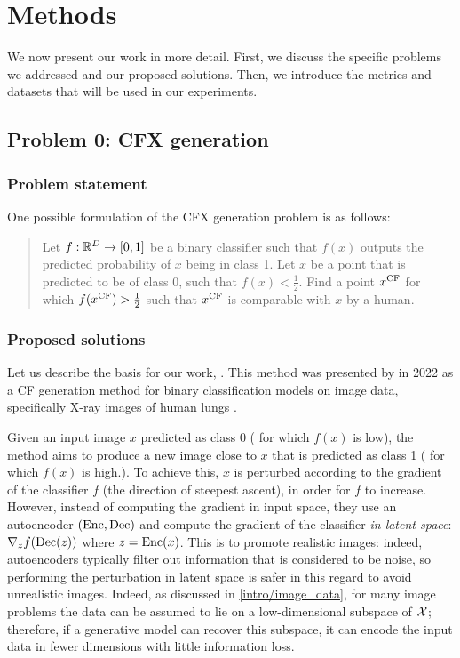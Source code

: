 \documentclass[../main.tex]{subfiles}
\begin{document}
\chapter{Methods}
\label{ch:methods}

We now present our work in more detail.
First, we discuss the specific problems we addressed and our proposed solutions.
Then, we introduce the metrics and datasets that will be used in our experiments.

\section{Problem 0: CFX generation}

\subsection{Problem statement}

One possible formulation of the CFX generation problem is as follows:
\begin{quote}
Let $f: \mathbb{R}^D \to [0, 1]$ be a binary classifier such that $f(x)$ outputs the predicted probability of $x$ being in class 1.
Let $x$ be a point that is predicted to be of class 0, \ie{} such that $f(x) < \frac{1}{2}$.
Find a point $x^\mathrm{CF}$ for which $f(x^\mathrm{CF}) > \frac{1}{2}$ such that $x^\mathrm{CF}$ is comparable with $x$ by a human.
\end{quote}

\subsection{Proposed solutions}

Let us describe the basis for our work, \ls{}.
This method was presented by \citeauthor{cohenGifsplanation2022} in 2022 as a CF generation method for binary classification models on image data, specifically X-ray images of human lungs \cite{cohenGifsplanation2022}.

Given an input image $x$ predicted as class 0 (\ie{} for which $f(x)$ is low), the method aims to produce a new image close to $x$ that is predicted as class 1 (\ie{} for which $f(x)$ is high.).
To achieve this, $x$ is perturbed according to the gradient of the classifier $f$ (the direction of steepest ascent), in order for $f$ to increase.
However, instead of computing the gradient in input space, they use an autoencoder $(\operatorname{Enc}, \operatorname{Dec})$ and compute the gradient of the classifier \emph{in latent space}: $\nabla_z f(\operatorname{Dec}(z))$ where $z = \operatorname{Enc}(x)$.
This is to promote realistic images: indeed, autoencoders typically filter out information that is considered to be noise, so performing the perturbation in latent space is safer in this regard to avoid unrealistic images.
Indeed, as discussed in \autoref{intro/image_data}, for many image problems the data can be assumed to lie on a low-dimensional subspace of $\mathcal{X}$; therefore, if a generative model can recover this subspace, it can encode the input data in fewer dimensions with little information loss.
\end{document}
